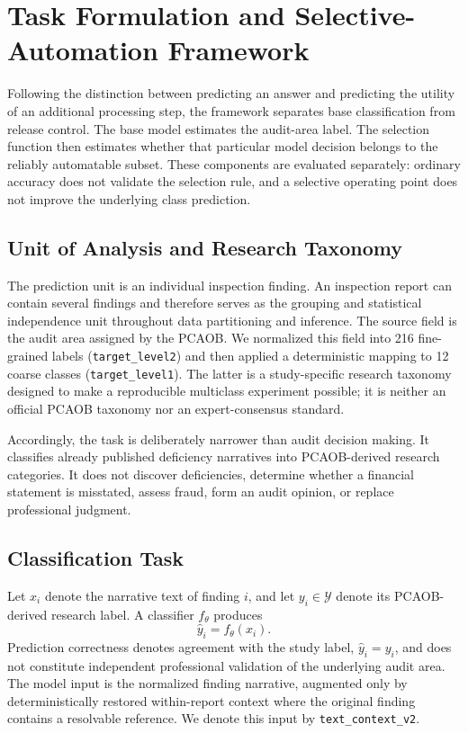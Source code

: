 \documentclass[11pt]{article}
\begin{document}
\section{Task Formulation and Selective-Automation Framework}
\label{sec:formulation}

Following the distinction between predicting an answer and predicting the
utility of an additional processing step, the framework separates base
classification from release control. The base model estimates the audit-area
label. The selection function then estimates whether that particular model
decision belongs to the reliably automatable subset. These components are
evaluated separately: ordinary accuracy does not validate the selection rule,
and a selective operating point does not improve the underlying class
prediction.

\subsection{Unit of Analysis and Research Taxonomy}

The prediction unit is an individual inspection finding. An inspection report can
contain several findings and therefore serves as the grouping and statistical
independence unit throughout data partitioning and inference. The source field is
the audit area assigned by the PCAOB. We normalized this field into 216 fine-grained
labels (\texttt{target\_level2}) and then applied a deterministic mapping to 12
coarse classes (\texttt{target\_level1}). The latter is a study-specific research
taxonomy designed to make a reproducible multiclass experiment possible; it is
neither an official PCAOB taxonomy nor an expert-consensus standard.

Accordingly, the task is deliberately narrower than audit decision making. It
classifies already published deficiency narratives into PCAOB-derived research
categories. It does not discover deficiencies, determine whether a financial
statement is misstated, assess fraud, form an audit opinion, or replace professional
judgment.

\subsection{Classification Task}

Let $x_i$ denote the narrative text of finding $i$, and let
$y_i \in \mathcal{Y}$ denote its PCAOB-derived research label. A classifier
$f_{\theta}$ produces
\begin{equation}
  \hat{y}_i = f_{\theta}(x_i).
  \label{eq:classifier}
\end{equation}
Prediction correctness denotes agreement with the study label,
$\hat{y}_i = y_i$, and does not constitute independent professional validation
of the underlying audit area. The model input is the normalized finding narrative,
augmented only by deterministically restored within-report context where the
original finding contains a resolvable reference. We denote this input by
\texttt{text\_context\_v2}.
\end{document}
